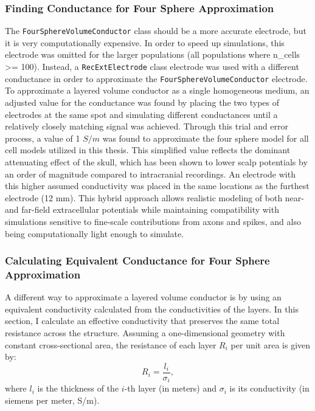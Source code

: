 \documentclass[final, a4paper,masters,en,listoffigures,listoftables,norwegiandates]{NMBU}
\begin{document}
\subsubsection{Finding Conductance for Four Sphere Approximation} \label{subsubsec: find sigma}
The \texttt{FourSphereVolumeConductor} class should be a more accurate electrode, but it is very computationally expensive. In order to speed up simulations, this electrode was omitted for the larger populations (all populations where n\_cells >= 100). Instead, a \texttt{RecExtElectrode} class electrode was used with a different conductance in order to approximate the \texttt{FourSphereVolumeConductor} electrode. To approximate a layered volume conductor as a single homogeneous medium, an adjusted value for the conductance was found by placing the two types of electrodes at the same spot and simulating different conductances until a relatively closely matching signal was achieved. Through this trial and error process, a value of 1 $S/m$ was found to approximate the four sphere model for all cell models utilized in this thesis. This simplified value reflects the dominant attenuating effect of the skull, which has been shown to lower scalp potentials by an order of magnitude compared to intracranial recordings. An electrode with this higher assumed conductivity was placed in the same locations as the furthest electrode (12 mm).
This hybrid approach allows realistic modeling of both near- and far-field extracellular potentials while maintaining compatibility with simulations sensitive to fine-scale contributions from axons and spikes, and also being computationally light enough to simulate.

\subsubsection{Calculating Equivalent Conductance for Four Sphere Approximation} \label{subsubsec: calc sigma}
A different way to approximate a layered volume conductor is by using an equivalent conductivity calculated from the conductivities of the layers. In this section, I calculate an effective conductivity that preserves the same total resistance across the structure. Assuming a one-dimensional geometry with constant cross-sectional area, the resistance of each layer \( R_i \) per unit area is given by:
\begin{equation}
    R_i = \frac{l_i}{\sigma_i},
\end{equation}
where \( l_i \) is the thickness of the \( i \)-th layer (in meters) and \( \sigma_i \) is its conductivity (in siemens per meter, S/m).
\end{document}
